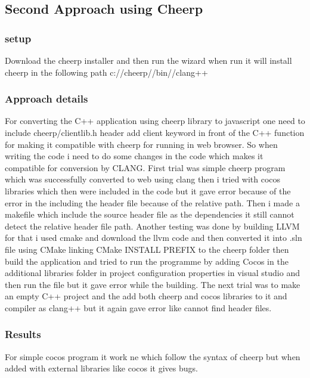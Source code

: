 \documentclass[23pt]{article}
\begin{document}
\subsection{Second Approach using Cheerp}

\subsubsection{setup}

{\Large Download the cheerp installer and then run the wizard when run it will install cheerp in the following path c://cheerp//bin//clang++ \par}

\subsubsection{Approach details}

{\Large For converting the C++ application using cheerp library to javascript one need to include cheerp/clientlib.h header add client keyword in front of the C++ function for making it compatible with cheerp for running in web browser. So when writing the code i need to do some changes in the code which makes it compatible for conversion by CLANG. First trial was simple cheerp program which was successfully converted to web using clang then i tried with cocos libraries which then were included in the code but it gave error because of the error in the including the header file because of the relative path. Then i made a makefile which include the source header file as the dependencies it still cannot detect the relative header file path. Another testing was done by building LLVM for that i used cmake and download the llvm code and then converted it into .sln file using CMake linking CMake INSTALL PREFIX to the cheerp folder then build the application and tried to run the programme by adding Cocos in the additional libraries folder in project configuration properties in visual studio and then run the file but it gave error while the building. The next trial was to make an empty C++ project and the add both cheerp and cocos libraries to it and compiler as clang++ but it again gave error like cannot find header files. \par}


\subsubsection{Results}

{\Large For simple cocos program it work ne which follow the syntax of cheerp but when added with external libraries like cocos it gives bugs. \par}
\end{document}
